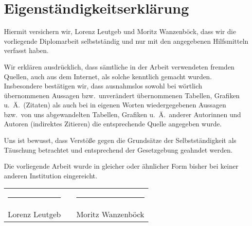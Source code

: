 \vspace*{\fill}
\section*{Eigenständigkeitserklärung}

Hiermit versichern wir, Lorenz Leutgeb und Moritz Wanzenböck, dass wir die vorliegende Diplomarbeit selbstständig und nur mit den angegebenen Hilfsmitteln verfasst haben. 

Wir erklären ausdrücklich, dass sämtliche in der Arbeit verwendeten fremden Quellen, auch aus dem Internet, als solche kenntlich gemacht wurden. Insbesondere bestätigen wir, dass ausnahmslos sowohl bei wörtlich übernommenen Aussagen bzw.\ unverändert übernommenen Tabellen, Grafiken u.~Ä.\ (Zitaten) als auch bei in eigenen Worten wiedergegebenen Aussagen bzw.\ von uns abgewandelten Tabellen, Grafiken u.~Ä.\ anderer Autorinnen und Autoren (indirektes Zitieren) die entsprechende Quelle angegeben wurde.

Uns ist bewusst, dass Verstöße gegen die Grundsätze der Selbstständigkeit als Täuschung betrachtet und entsprechend der Gesetzgebung geahndet werden.

Die vorliegende Arbeit wurde in gleicher oder ähnlicher Form bisher bei keiner anderen Institution eingereicht.

\vspace{3cm}

\begin{center}
\begin{tabular}{ccc}
    \rule{0.4\textwidth}{0.5pt} & \hspace{5mm} & \rule{0.4\textwidth}{0.5pt} \\
    Lorenz Leutgeb & & Moritz Wanzenböck
\end{tabular}
\end{center}
\vspace*{\fill}
